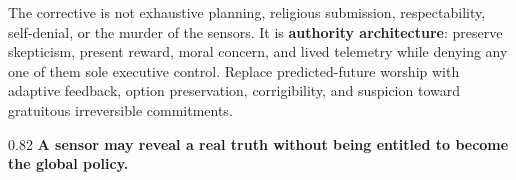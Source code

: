 \documentclass[10pt,letterpaper]{article}
\newenvironment{thesisbox}
  {\Needspace{3.5\baselineskip}\par\vspace{0.32em}\begin{center}\begingroup
   \begin{lrbox}{\thesisboxsave}\begin{varwidth}{0.82\linewidth}
   \normalsize\rmfamily\bfseries\upshape\RaggedRight}
  {\end{varwidth}\end{lrbox}\fbox{\usebox{\thesisboxsave}}
   \endgroup\end{center}\vspace{0.32em}}
\begin{document}
\begin{center}
\begin{minipage}{0.82\textwidth}
The corrective is not exhaustive planning, religious submission,
respectability, self-denial, or the murder of the sensors. It is
\textbf{authority architecture}: preserve skepticism, present reward,
moral concern, and lived telemetry while denying any one of them sole
executive control. Replace predicted-future worship with adaptive
feedback, option preservation, corrigibility, and suspicion toward
gratuitous irreversible commitments.

\begin{thesisbox}
A sensor may reveal a real truth without being entitled to
become the global policy.
\end{thesisbox}

\end{minipage}
\end{center}

\vspace{0.32em}
\end{document}
